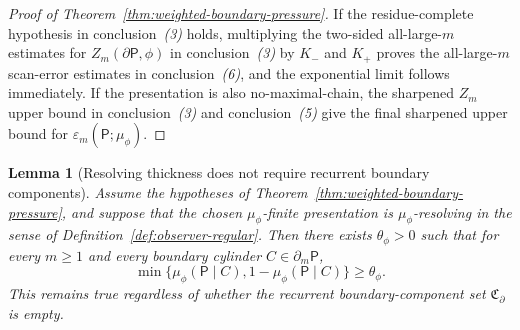 \documentclass{etds}%
\numberwithin{equation}{section}
\theoremstyle{plain}
\newtheorem{lemma}[theorem]{Lemma}
\theoremstyle{definition}
\theoremstyle{remark}
\begin{document}
\begin{proof}[Proof of Theorem~\ref{thm:weighted-boundary-pressure}]
If the residue-complete hypothesis in conclusion~\emph{(3)} holds, multiplying the
two-sided all-large-$m$ estimates for $Z_m(\partial\mathsf{P},\phi)$ in
conclusion~\emph{(3)} by $K_-$ and $K_+$ proves the all-large-$m$ scan-error estimates
in conclusion~\emph{(6)}, and the exponential limit follows immediately.  If the
presentation is also no-maximal-chain, the sharpened $Z_m$ upper bound in
conclusion~\emph{(3)} and conclusion~\emph{(5)} give the final sharpened upper bound for
$\varepsilon_m(\mathsf{P};\mu_\phi)$.
\end{proof}

\begin{lemma}[Resolving thickness does not require recurrent boundary components]
\label{lem:weighted-thickness-without-components}
Assume the hypotheses of Theorem~\ref{thm:weighted-boundary-pressure}, and
suppose that the chosen $\mu_\phi$-finite presentation is
$\mu_\phi$-resolving in the sense of
Definition~\ref{def:observer-regular}.  Then there exists $\theta_\phi>0$ such
that for every $m\ge 1$ and every boundary cylinder
$C\in\partial_m\mathsf{P}$,
\[
\min\{\mu_\phi(\mathsf{P}\mid C),1-\mu_\phi(\mathsf{P}\mid C)\}\ge \theta_\phi.
\]
This remains true regardless of whether the recurrent boundary-component set
$\mathfrak{C}_\partial$ is empty.
\end{lemma}
\end{document}
